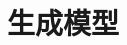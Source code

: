 \setcounter{chapter}{7}

\hypertarget{ux751fux6210ux6a21ux578b}{%
\chapter{生成模型}\label{ux751fux6210ux6a21ux578b}}
